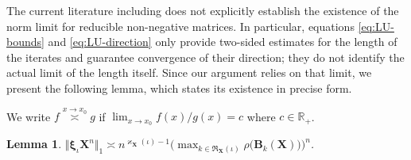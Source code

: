 \documentclass[12pt]{iopart}
\newtheorem{lemma}[theorem]{Lemma}
\newcommand*{\bbbxi}{\boldsymbol{\xi}}
\begin{document}
The current literature including \cite{lustig2016perron} does not 
explicitly establish the existence of the norm limit for reducible non-negative matrices. 
In particular, equations \eqref{eq:LU-bounds} and \eqref{eq:LU-direction} only provide 
two-sided estimates for the length of the iterates and guarantee convergence of their direction; 
they do not identify the actual limit of the length itself. 
Since our argument relies on that limit, 
we present the following lemma, which states its existence in precise form.

We write $f \overset{x\to x_0}{\asymp} g$ if $\lim_{x\to x_0} f(x)/g(x)=c$ where $c \in \mathbb R_+$.
\begin{lemma}\label{lemma:asymp-value}
$\displaystyle\big\Vert \bbbxi_\iota \mathbf{X}^n\big\Vert_1
\asymp 
    n^{\varkappa_{\mathbf X}(\iota)-1}
    \Big(
    \max_{k\in\mathfrak R_{\mathbf X}(\iota)}
    \rho\big(\mathbf B_k(\mathbf X)\big)
    \Big)^n
$.
\end{lemma}
\end{document}
